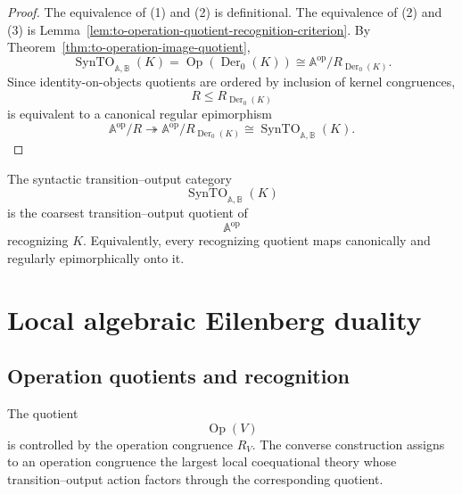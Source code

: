 \begin{proof}
    The equivalence of (1) and (2) is definitional. The equivalence of (2) and
    (3) is Lemma~\ref{lem:to-operation-quotient-recognition-criterion}. By
    Theorem~\ref{thm:to-operation-image-quotient},
    \[
        \operatorname{SynTO}_{\mathbb A,\mathbb B}(K)
        =
        \operatorname{Op}(\operatorname{Der}_0(K))
        \cong
        \mathbb A^{\mathrm{op}}/
        R_{\operatorname{Der}_0(K)}.
    \]
    Since identity-on-objects quotients are ordered by inclusion of kernel
    congruences,
    \[
        R\leq R_{\operatorname{Der}_0(K)}
    \]
    is equivalent to a canonical regular epimorphism
    \[
        \mathbb A^{\mathrm{op}}/R
        \twoheadrightarrow
        \mathbb A^{\mathrm{op}}/
        R_{\operatorname{Der}_0(K)}
        \cong
        \operatorname{SynTO}_{\mathbb A,\mathbb B}(K).
    \]
\end{proof}

\begin{corollary}
\label{cor:to-syntactic-transition-output-quotient}
    The syntactic transition--output category
    \[
        \operatorname{SynTO}_{\mathbb A,\mathbb B}(K)
    \]
    is the coarsest transition--output quotient of
    \[
        \mathbb A^{\mathrm{op}}
    \]
    recognizing \(K\). Equivalently, every recognizing quotient maps
    canonically and regularly epimorphically onto it.
\end{corollary}

\section{Local algebraic Eilenberg duality}
\label{sec:local-algebraic-eilenberg-duality}

\subsection{Operation quotients and recognition}
\label{subsec:to-operation-quotients-recognition}

The quotient
\[
    \operatorname{Op}(V)
\]
is controlled by the operation congruence \(R_V\). The converse construction
assigns to an operation congruence the largest local coequational theory whose
transition--output action factors through the corresponding quotient.

